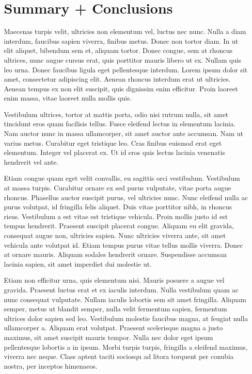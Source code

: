 \documentclass[
]{article}
\begin{document}
\section{Summary + Conclusions}\label{summary-conclusions}

Maecenas turpis velit, ultricies non elementum vel, luctus nec nunc.
Nulla a diam interdum, faucibus sapien viverra, finibus metus. Donec non
tortor diam. In ut elit aliquet, bibendum sem et, aliquam tortor. Donec
congue, sem at rhoncus ultrices, nunc augue cursus erat, quis porttitor
mauris libero ut ex. Nullam quis leo urna. Donec faucibus ligula eget
pellentesque interdum. Lorem ipsum dolor sit amet, consectetur
adipiscing elit. Aenean rhoncus interdum erat ut ultricies. Aenean
tempus ex non elit suscipit, quis dignissim enim efficitur. Proin
laoreet enim massa, vitae laoreet nulla mollis quis.

Vestibulum ultrices, tortor at mattis porta, odio nisi rutrum nulla, sit
amet tincidunt eros quam facilisis tellus. Fusce eleifend lectus in
elementum lacinia. Nam auctor nunc in massa ullamcorper, sit amet auctor
ante accumsan. Nam ut varius metus. Curabitur eget tristique leo. Cras
finibus euismod erat eget elementum. Integer vel placerat ex. Ut id eros
quis lectus lacinia venenatis hendrerit vel ante.

Etiam congue quam eget velit convallis, eu sagittis orci vestibulum.
Vestibulum at massa turpis. Curabitur ornare ex sed purus vulputate,
vitae porta augue rhoncus. Phasellus auctor suscipit purus, vel
ultricies nunc. Nunc eleifend nulla ac purus volutpat, id fringilla
felis aliquet. Duis vitae porttitor nibh, in rhoncus risus. Vestibulum a
est vitae est tristique vehicula. Proin mollis justo id est tempus
hendrerit. Praesent suscipit placerat congue. Aliquam eu elit gravida,
consequat augue non, ultricies sapien. Nunc ultricies viverra ante, sit
amet vehicula ante volutpat id. Etiam tempus purus vitae tellus mollis
viverra. Donec at ornare mauris. Aliquam sodales hendrerit ornare.
Suspendisse accumsan lacinia sapien, sit amet imperdiet dui molestie ut.

Etiam non efficitur urna, quis elementum nisi. Mauris posuere a augue
vel gravida. Praesent luctus erat et ex iaculis interdum. Nulla
vestibulum quam ac nunc consequat vulputate. Nullam iaculis lobortis sem
sit amet fringilla. Aliquam semper, metus ut blandit semper, nulla velit
fermentum sapien, fermentum ultrices dolor sapien sed leo. Vestibulum
molestie faucibus magna, at feugiat nulla ullamcorper a. Aliquam erat
volutpat. Praesent scelerisque magna a justo maximus, sit amet suscipit
mauris tempor. Nulla nec dolor eget ipsum pellentesque lobortis a in
ipsum. Morbi turpis turpis, fringilla a eleifend maximus, viverra nec
neque. Class aptent taciti sociosqu ad litora torquent per conubia
nostra, per inceptos himenaeos.
\end{document}

